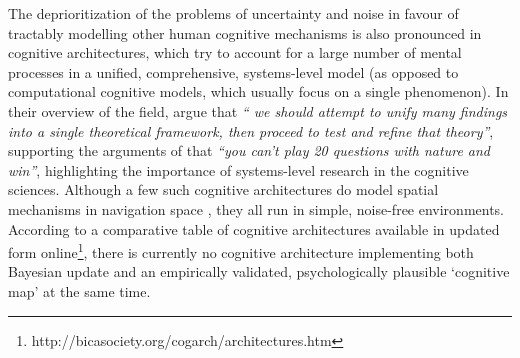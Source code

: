 The deprioritization of the problems of uncertainty and noise in favour of tractably modelling other human cognitive mechanisms is also pronounced in cognitive architectures, which try to account for a large number of mental processes in a unified, comprehensive, systems-level model (as opposed to computational cognitive models, which usually focus on a single phenomenon). In their overview of the field, \cite{langley2009cognitive} argue that \textit{`` we should attempt to unify many findings into a single theoretical framework, then proceed to test and refine that theory''}, supporting the arguments of \cite{newell1973you} that \textit{``you can't play 20 questions with nature and win''}, highlighting the importance of systems-level research in the cognitive sciences. Although a few such cognitive architectures do model spatial mechanisms in navigation space \citep{harrison2003act,schultheis2011casimir,sun2004top}, they all run in simple, noise-free environments. According to a comparative table of cognitive architectures \citep{samsonovich2011comparative} available in updated form online\footnote{http://bicasociety.org/cogarch/architectures.htm}, there is currently no cognitive architecture implementing both Bayesian update and an empirically validated, psychologically plausible `cognitive map' at the same time.

\clearpage

